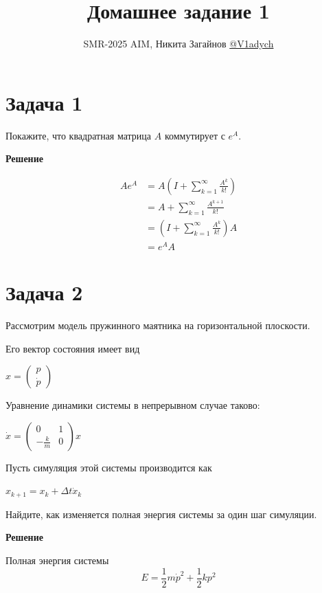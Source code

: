 \documentclass{article}
\newcommand{\solution}{\medskip\textbf{Решение}\medskip}
\begin{document}
\title{Домашнее задание 1}
\date{}
\author{SMR-2025 AIM, Никита Загайнов \href{https://t.me/V1adych}{@V1adych}}
\maketitle

\section*{Задача 1}

Покажите, что квадратная матрица $A$ коммутирует с $e^A$.

\solution

\begin{align*}
    A e^A & = A \left( I + \sum_{k=1}^{\infty} \frac{A^k}{k!} \right) \\
          & = A + \sum_{k=1}^{\infty} \frac{A^{k+1}}{k!}              \\
          & = \left( I + \sum_{k=1}^{\infty} \frac{A^k}{k!} \right) A \\
          & = e^A A
\end{align*}

\medskip

\section*{Задача 2}

\noindent Рассмотрим модель пружинного маятника на горизонтальной плоскости.

Его вектор состояния имеет вид

$x = \begin{pmatrix}
        p \\
        \dot{p}
    \end{pmatrix}$

Уравнение динамики системы в непрерывном случае таково:

$\dot{x} =  \begin{pmatrix}
        0             & 1 \\
        - \frac{k}{m} & 0
    \end{pmatrix} x$

Пусть симуляция этой системы производится как

$x_{k+1} = x_k + \Delta t \dot{x}_k$

Найдите, как изменяется полная энергия системы за один шаг симуляции.

\solution

Полная энергия системы
\[
    E = \frac{1}{2} m \dot{p}^2 + \frac{1}{2} k p^2
\]
\end{document}
